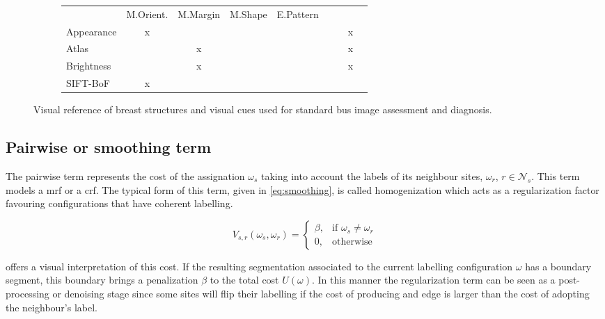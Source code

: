 \begin{figure}
\begin{subfigure}[b]{\textwidth}
\begin{tabular}{lcccccccc}
                  &M.Orient.  %
                  &M.Margin   %
                  &M.Shape    %
                  &E.Pattern\\%
       Appearance & x &   &  &  &  &  & x & \\
       Atlas      &   & x &  &  &  &  & x & \\
       Brightness &   & x &  &  &  &  & x & \\
       SIFT-BoF   & x &   &  &  &  &  &   & \\
      \end{tabular}
    \end{subfigure}
    \caption {{\small Visual reference of breast structures and visual cues used for standard \ac{bus} image assessment and diagnosis.}} 
    \label{fig:features}
\end{figure}


\subsection{Pairwise or smoothing term} \label{sec:method:mrfTerm}
 
The pairwise term represents the cost of the assignation $\omega_s$ taking into account the labels of its neighbour sites, $\omega_r$, $r \in \mathcal{N}_{s}$. 
This term models a \ac{mrf} or a \ac{crf}.
The typical form of this term, given in \cref{eq:smoothing}, is called homogenization which acts as a regularization factor favouring configurations that have coherent labelling.

\begin{equation}
V_{s,r}(\omega_s,\omega_r) = 
\begin{cases}
    \beta, & \text{if } \omega_s \ne \omega_r\\
    0,              & \text{otherwise}
\end{cases}
\label{eq:smoothing}
\end{equation}

 offers a visual interpretation of this cost.
If the resulting segmentation associated to the current labelling configuration $\omega$ has a boundary segment, this boundary brings a penalization $\beta$ to the total cost $U(\omega)$.
In this manner the regularization term can be seen as a post-processing or denoising stage since some sites will flip their labelling if the cost of producing and edge is larger than the cost of adopting the neighbour's label. 

